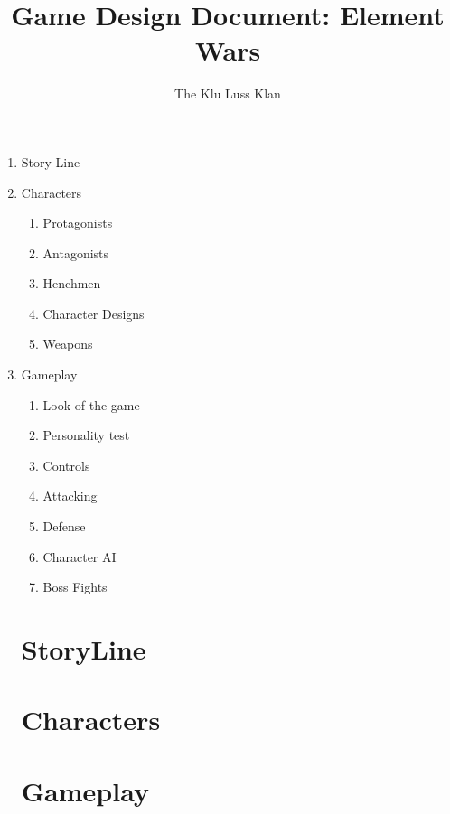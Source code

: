 \documentclass[a4paper, 11pt]{article}
\title{Game Design Document: Element Wars}
\author{The Klu Luss Klan}
\begin{document}
\maketitle


\begin{enumerate}

\item Story Line

\item Characters
	\begin{enumerate}
		\item Protagonists	
		\item Antagonists 
		\item Henchmen
		\item Character Designs
		\item Weapons
	\end{enumerate}
\item Gameplay
	\begin{enumerate}
		\item Look of the game
		\item Personality test 
		\item Controls
		\item Attacking 
		\item Defense 
		\item Character AI
		\item Boss Fights

	\end{enumerate}

\section{StoryLine}
\section{Characters}
\section{Gameplay}

\end{enumerate}
\end{document}
